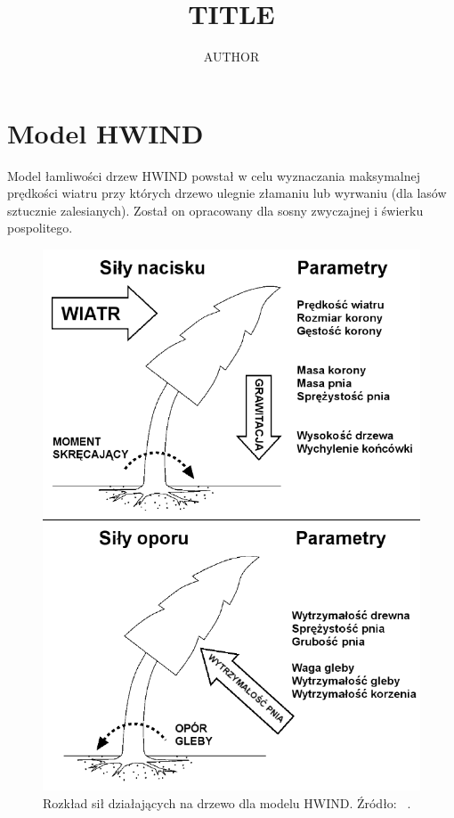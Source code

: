 \documentclass[a4paper,12pt]{article}
\title{TITLE}
\author{AUTHOR}
\begin{document}
\maketitle

\section{Model HWIND}

Model łamliwości drzew HWIND powstał w celu wyznaczania maksymalnej prędkości wiatru przy których drzewo ulegnie złamaniu lub wyrwaniu (dla lasów sztucznie zalesianych). Został on opracowany dla sosny zwyczajnej i świerku pospolitego.

\begin{figure}[!h]
	\center
	\includegraphics[scale=0.45]{HWIND1}
	\caption{Rozkład sił działających na drzewo dla modelu HWIND. Źródło: ~\cite{chm_mgza}.}
	\label{fig:HWIND1}
\end{figure} 
\end{document}
